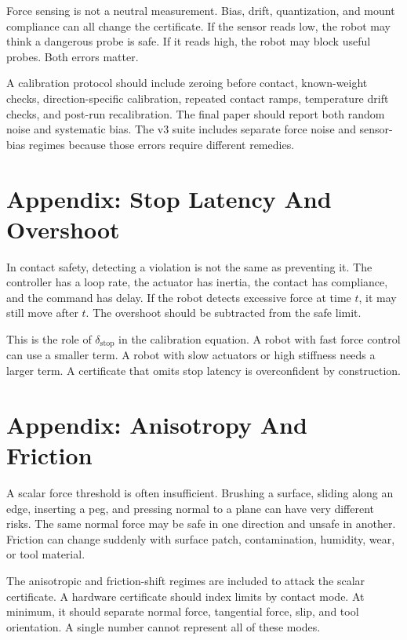 \documentclass{article}
\begin{document}
Force sensing is not a neutral measurement. Bias, drift, quantization, and
mount compliance can all change the certificate. If the sensor reads low, the
robot may think a dangerous probe is safe. If it reads high, the robot may
block useful probes. Both errors matter.

A calibration protocol should include zeroing before contact, known-weight
checks, direction-specific calibration, repeated contact ramps, temperature
drift checks, and post-run recalibration. The final paper should report both
random noise and systematic bias. The v3 suite includes separate force noise
and sensor-bias regimes because those errors require different remedies.

\section{Appendix: Stop Latency And Overshoot}

In contact safety, detecting a violation is not the same as preventing it. The
controller has a loop rate, the actuator has inertia, the contact has
compliance, and the command has delay. If the robot detects excessive force at
time $t$, it may still move after $t$. The overshoot should be subtracted from
the safe limit.

This is the role of $\delta_{\mathrm{stop}}$ in the calibration equation. A
robot with fast force control can use a smaller term. A robot with slow
actuators or high stiffness needs a larger term. A certificate that omits stop
latency is overconfident by construction.

\section{Appendix: Anisotropy And Friction}

A scalar force threshold is often insufficient. Brushing a surface, sliding
along an edge, inserting a peg, and pressing normal to a plane can have very
different risks. The same normal force may be safe in one direction and unsafe
in another. Friction can change suddenly with surface patch, contamination,
humidity, wear, or tool material.

The anisotropic and friction-shift regimes are included to attack the scalar
certificate. A hardware certificate should index limits by contact mode. At
minimum, it should separate normal force, tangential force, slip, and tool
orientation. A single number cannot represent all of these modes.
\end{document}
